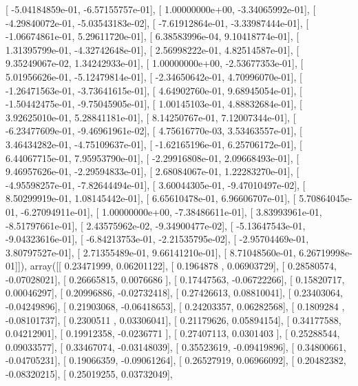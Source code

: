 \documentclass{article}
\begin{document}
       [ -5.04184859e-01,  -6.57155757e-01],
       [  1.00000000e+00,  -3.34065992e-01],
       [ -4.29840072e-01,  -5.03543183e-02],
       [ -7.61912864e-01,  -3.33987444e-01],
       [ -1.06674861e-01,   5.29611720e-01],
       [  6.38583996e-04,   9.10418774e-01],
       [  1.31395799e-01,  -4.32742648e-01],
       [  2.56998222e-01,   4.82514587e-01],
       [  9.35249067e-02,   1.34242933e-01],
       [  1.00000000e+00,  -2.53677353e-01],
       [  5.01956626e-01,  -5.12479814e-01],
       [ -2.34650642e-01,   4.70996070e-01],
       [ -1.26471563e-01,  -3.73641615e-01],
       [  4.64902760e-01,   9.68945054e-01],
       [ -1.50442475e-01,  -9.75045905e-01],
       [  1.00145103e-01,   4.88832684e-01],
       [  3.92625010e-01,   5.28841181e-01],
       [  8.14250767e-01,   7.12007344e-01],
       [ -6.23477609e-01,  -9.46961961e-02],
       [  4.75616770e-03,   3.53463557e-01],
       [  3.46434282e-01,  -4.75109637e-01],
       [ -1.62165196e-01,   6.25706172e-01],
       [  6.44067715e-01,   7.95953790e-01],
       [ -2.29916808e-01,   2.09668493e-01],
       [  9.46957626e-01,  -2.29594833e-01],
       [  2.68084067e-01,   1.22283270e-01],
       [ -4.95598257e-01,  -7.82644494e-01],
       [  3.60044305e-01,  -9.47010497e-02],
       [  8.50299919e-01,   1.08145442e-01],
       [  6.65610478e-01,   6.96606707e-01],
       [  5.70864045e-01,  -6.27094911e-01],
       [  1.00000000e+00,  -7.38486611e-01],
       [  3.83993961e-01,  -8.51797661e-01],
       [  2.43575962e-02,  -9.34900477e-02],
       [ -5.13647543e-01,  -9.04323616e-01],
       [ -6.84213753e-01,  -2.21535795e-02],
       [ -2.95704469e-01,   3.80797527e-01],
       [  2.71355489e-01,   9.66141210e-01],
       [  8.71048560e-01,   6.26719998e-01]]), array([[ 0.23471999,  0.06201122],
       [ 0.1964878 ,  0.06903729],
       [ 0.28580574, -0.07028021],
       [ 0.26665815,  0.0076686 ],
       [ 0.17447563, -0.06722266],
       [ 0.15820717,  0.00046297],
       [ 0.20996886, -0.02732418],
       [ 0.27426613,  0.08810041],
       [ 0.23403064, -0.04249896],
       [ 0.21903068, -0.06418653],
       [ 0.24203357,  0.06282568],
       [ 0.1809284 , -0.08101737],
       [ 0.2300511 ,  0.03306041],
       [ 0.21179626,  0.05894154],
       [ 0.34177588,  0.04212901],
       [ 0.19912358, -0.0236771 ],
       [ 0.27407113,  0.0301403 ],
       [ 0.25288544,  0.09033577],
       [ 0.33467074, -0.03148039],
       [ 0.35523619, -0.09419896],
       [ 0.34800661, -0.04705231],
       [ 0.19066359, -0.09061264],
       [ 0.26527919,  0.06966092],
       [ 0.20482382, -0.08320215],
       [ 0.25019255,  0.03732049],
\end{document}

